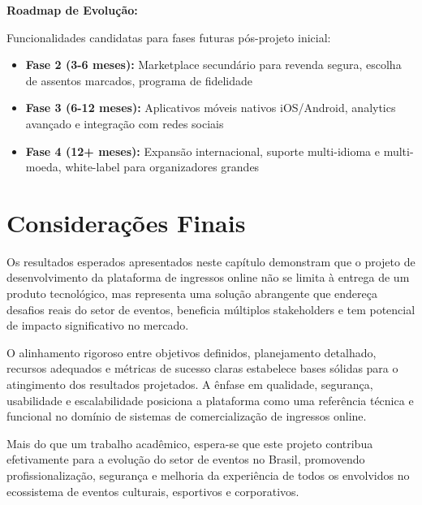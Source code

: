 \textbf{Roadmap de Evolução:}

Funcionalidades candidatas para fases futuras pós-projeto inicial:
\begin{itemize}
    \item \textbf{Fase 2 (3-6 meses):} Marketplace secundário para revenda segura, escolha de assentos marcados, programa de fidelidade
    \item \textbf{Fase 3 (6-12 meses):} Aplicativos móveis nativos iOS/Android, analytics avançado e integração com redes sociais
    \item \textbf{Fase 4 (12+ meses):} Expansão internacional, suporte multi-idioma e multi-moeda, white-label para organizadores grandes
\end{itemize}

\section{Considerações Finais}

Os resultados esperados apresentados neste capítulo demonstram que o projeto de desenvolvimento da plataforma de ingressos online não se limita à entrega de um produto tecnológico, mas representa uma solução abrangente que endereça desafios reais do setor de eventos, beneficia múltiplos stakeholders e tem potencial de impacto significativo no mercado.

O alinhamento rigoroso entre objetivos definidos, planejamento detalhado, recursos adequados e métricas de sucesso claras estabelece bases sólidas para o atingimento dos resultados projetados. A ênfase em qualidade, segurança, usabilidade e escalabilidade posiciona a plataforma como uma referência técnica e funcional no domínio de sistemas de comercialização de ingressos online.

Mais do que um trabalho acadêmico, espera-se que este projeto contribua efetivamente para a evolução do setor de eventos no Brasil, promovendo profissionalização, segurança e melhoria da experiência de todos os envolvidos no ecossistema de eventos culturais, esportivos e corporativos.

